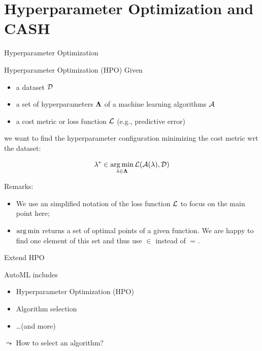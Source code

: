 \section{Hyperparameter Optimization and CASH}
\begin{frame}[c]{Hyperparameter Optimization}

\begin{block}{Hyperparameter Optimization (HPO)}
Given
\begin{itemize}
  \item a dataset $\mathcal{D}$
  \item a set of hyperparameters $\mathbf{\Lambda}$ of a machine learning algorithms $\mathcal{A}$
  \item a cost metric or loss function $\mathcal{L}$ (e.g., predictive error)
\end{itemize}
we want to find the hyperparameter configuration minimizing the cost metric wrt the dataset:

\begin{equation}
\mathbf{\lambda}^* \in \operatorname*{arg\,min}_{\mathbf{\lambda} \in \mathbf{\Lambda}} \mathcal{L}(\mathcal{A}(\mathbf{\lambda}), \mathcal{D}) \nonumber
\end{equation}

\end{block}

\pause
Remarks: 

\begin{itemize}
  \item We use an simplified notation of the loss function $\mathcal{L}$ to focus on the main point here;
  \pause
  \item $\operatorname*{arg\,min}$ returns a set of optimal points of a given function. We are happy to find one element of this set and thus use $\in$ instead of $=$.
\end{itemize}

\end{frame}
\begin{frame}[c]{Extend HPO}

AutoML includes

\begin{itemize}
  \item Hyperparameter Optimization (HPO)
  \item Algorithm selection 
  \item \ldots (and more)
\end{itemize}

\pause
$\leadsto$ How to select an algorithm?


\end{frame}
